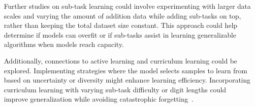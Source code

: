 Further studies on sub-task learning could involve experimenting with larger data scales and varying the amount of addition data while adding sub-tasks on top, rather than keeping the total dataset size constant. This approach could help determine if models can overfit or if sub-tasks assist in learning generalizable algorithms when models reach capacity.

Additionally, connections to active learning and curriculum learning could be explored. Implementing strategies where the model selects samples to learn from based on uncertainty or diversity might enhance learning efficiency. Incorporating curriculum learning with varying sub-task difficulty or digit lengths could improve generalization while avoiding catastrophic forgetting~\parencite{parisi_continual_2019}.
